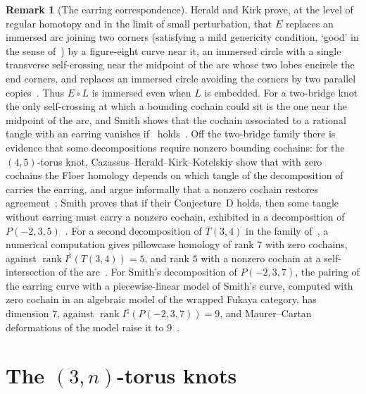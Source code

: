 \documentclass[11pt,reqno]{amsart}
\theoremstyle{plain}
\theoremstyle{definition}
\newtheorem{remark}[theorem]{Remark}
\newcommand{\Inat}{I^{\natural}}
\begin{document}
\begin{remark}[The earring correspondence]\label{rmk:earring}
Herald and Kirk prove, at the level of regular homotopy and in the limit of small perturbation, that $E$
replaces an immersed arc joining two corners (satisfying a mild genericity condition, `good' in the sense
of~\cite{HK}) by a figure-eight curve near it, an immersed circle with a single transverse self-crossing
near the midpoint of the arc whose two lobes encircle the end corners, and replaces an immersed circle
avoiding the corners by two parallel copies~\cite[Thm.~B, \S6.4.2, Thms.~6.8 and 6.15]{HK}. Thus $E\circ L$
is immersed even when $L$ is embedded. For a two-bridge knot the only self-crossing at which a bounding
cochain could sit is the one near the midpoint of the arc, and Smith shows that the cochain associated to
a rational tangle with an earring vanishes if~\cite[Conj.~D]{CHKK} holds~\cite[Lemma~5.3]{Smith}. Off the
two-bridge family there is evidence that some decompositions require nonzero bounding cochains: for the
$(4,5)$-torus knot, Cazassus--Herald--Kirk--Kotelskiy show that with zero cochains the Floer homology
depends on which tangle of the decomposition of~\cite[\S11.8]{HHK2} carries the earring, and argue
informally that a nonzero cochain restores agreement~\cite[\S10.3]{CHKK}; Smith proves that if their
Conjecture~D holds, then some tangle without earring must carry a nonzero cochain, exhibited in a
decomposition of $P(-2,3,5)$~\cite[Thm.~5.9]{Smith}. For a second decomposition of $T(3,4)$
in the family of~\cite[\S10]{HHK2}, a numerical computation gives pillowcase homology of rank $7$ with zero
cochains, against $\operatorname{rank}\Inat(T(3,4))=5$, and rank $5$ with a nonzero cochain at a
self-intersection of the arc~\cite[\S7]{WuebbenV}. For Smith's decomposition of $P(-2,3,7)$, the pairing of
the earring curve with a piecewise-linear model of Smith's curve, computed with zero cochain in an algebraic
model of the wrapped Fukaya category, has dimension $7$, against $\operatorname{rank}\Inat(P(-2,3,7))=9$, and
Maurer--Cartan deformations of the model raise it to $9$~\cite{WuebbenIIb}.
\end{remark}

\section{The \texorpdfstring{$(3,n)$}{(3,n)}-torus knots}\label{sec:3n}
\end{document}
